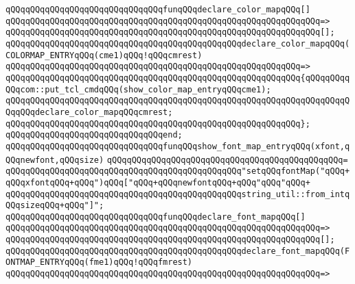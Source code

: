 \verb|qQQqqQQqqQQqqQQqqQQqqQQqqQQqqQQqfunqQQqdeclare_color_mapqQQq[]|\newline
\verb|qQQqqQQqqQQqqQQqqQQqqQQqqQQqqQQqqQQqqQQqqQQqqQQqqQQqqQQqqQQqqQQq=>|\newline
\verb|qQQqqQQqqQQqqQQqqQQqqQQqqQQqqQQqqQQqqQQqqQQqqQQqqQQqqQQqqQQqqQQq[];|\newline
\newline
\verb|qQQqqQQqqQQqqQQqqQQqqQQqqQQqqQQqqQQqqQQqqQQqqQQqdeclare_color_mapqQQq(COLORMAP_ENTRYqQQq(cme1)qQQq!qQQqcmrest)|\newline
\verb|qQQqqQQqqQQqqQQqqQQqqQQqqQQqqQQqqQQqqQQqqQQqqQQqqQQqqQQqqQQq=>|\newline
\verb|qQQqqQQqqQQqqQQqqQQqqQQqqQQqqQQqqQQqqQQqqQQqqQQqqQQqqQQqqQQq{qQQqqQQqqQQqcom::put_tcl_cmdqQQq(show_color_map_entryqQQqcme1);|\newline
\verb|qQQqqQQqqQQqqQQqqQQqqQQqqQQqqQQqqQQqqQQqqQQqqQQqqQQqqQQqqQQqqQQqqQQqqQQqqQQqdeclare_color_mapqQQqcmrest;|\newline
\verb|qQQqqQQqqQQqqQQqqQQqqQQqqQQqqQQqqQQqqQQqqQQqqQQqqQQqqQQqqQQq};|\newline
\verb|qQQqqQQqqQQqqQQqqQQqqQQqqQQqqQQqend;|\newline
\newline
\verb|qQQqqQQqqQQqqQQqqQQqqQQqqQQqqQQqfunqQQqshow_font_map_entryqQQq(xfont,qQQqnewfont,qQQqsize)|\newline
\verb|qQQqqQQqqQQqqQQqqQQqqQQqqQQqqQQqqQQqqQQqqQQqqQQq=|\newline
\verb|qQQqqQQqqQQqqQQqqQQqqQQqqQQqqQQqqQQqqQQqqQQqqQQq"setqQQqfontMap("qQQq+qQQqxfontqQQq+qQQq")qQQq["qQQq+qQQqnewfontqQQq+qQQq"qQQq"qQQq+|\newline
\verb|qQQqqQQqqQQqqQQqqQQqqQQqqQQqqQQqqQQqqQQqqQQqqQQqstring_util::from_intqQQqsizeqQQq+qQQq"]";|\newline
\newline
\verb|qQQqqQQqqQQqqQQqqQQqqQQqqQQqqQQqfunqQQqdeclare_font_mapqQQq[]|\newline
\verb|qQQqqQQqqQQqqQQqqQQqqQQqqQQqqQQqqQQqqQQqqQQqqQQqqQQqqQQqqQQqqQQq=>|\newline
\verb|qQQqqQQqqQQqqQQqqQQqqQQqqQQqqQQqqQQqqQQqqQQqqQQqqQQqqQQqqQQqqQQq[];|\newline
\newline
\verb|qQQqqQQqqQQqqQQqqQQqqQQqqQQqqQQqqQQqqQQqqQQqqQQqdeclare_font_mapqQQq(FONTMAP_ENTRYqQQq(fme1)qQQq!qQQqfmrest)|\newline
\verb|qQQqqQQqqQQqqQQqqQQqqQQqqQQqqQQqqQQqqQQqqQQqqQQqqQQqqQQqqQQqqQQq=>|\newline
